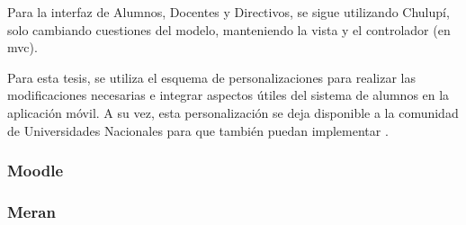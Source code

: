 Para la interfaz de Alumnos, Docentes y Directivos, se sigue utilizando Chulupí, solo cambiando cuestiones del modelo, manteniendo la vista y el controlador (en \gls{mvc}).

Para esta tesis, se utiliza el esquema de personalizaciones para realizar las modificaciones necesarias e integrar aspectos útiles del sistema de alumnos en la aplicación móvil. A su vez, esta personalización se deja disponible a la comunidad de Universidades Nacionales para que también puedan implementar \nombreApp.


\subsubsection{Moodle}
\label{moodle}

\subsubsection{Meran}
\label{merans}